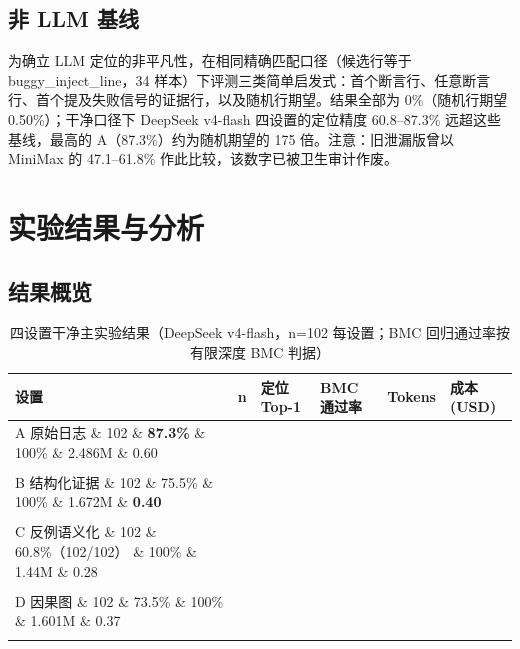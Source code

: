 \documentclass[journal]{IEEEtran}
\begin{document}
\subsection{非 LLM 基线}

为确立 LLM 定位的非平凡性，在相同精确匹配口径（候选行等于 buggy\_inject\_line，34 样本）下评测三类简单启发式：首个断言行、任意断言行、首个提及失败信号的证据行，以及随机行期望。结果全部为 0\%（随机行期望 0.50\%）；干净口径下 DeepSeek v4-flash 四设置的定位精度 60.8--87.3\% 远超这些基线，最高的 A（87.3\%）约为随机期望的 175 倍。注意：旧泄漏版曾以 MiniMax 的 47.1--61.8\% 作此比较，该数字已被卫生审计作废。

\section{实验结果与分析}

\subsection{结果概览}

\begin{table}[!t]
\centering
\caption{四设置干净主实验结果（DeepSeek v4-flash，n=102 每设置；BMC 回归通过率按有限深度 BMC 判据）}
\label{tab:main}
\scriptsize
\setlength{\tabcolsep}{3pt}
\renewcommand{\arraystretch}{1.12}
\begin{tabular}{p{}cp{}p{}p{}p{}}
\toprule
\textbf{设置} & \textbf{n} & \textbf{定位 Top-1} & \textbf{BMC 通过率} & \textbf{Tokens} & \textbf{成本(USD)} \\
\midrule
A 原始日志 \& 102 \& \textbf{87.3\%} \& 100\% \& 2.486M \& 0.60 \\\\
B 结构化证据 \& 102 \& 75.5\% \& 100\% \& 1.672M \& \textbf{0.40} \\\\
C 反例语义化 \& 102 \& 60.8\%（102/102） \& 100\% \& 1.44M \& 0.28 \\\\
D 因果图 \& 102 \& 73.5\% \& 100\% \& 1.601M \& 0.37 \\\\
\bottomrule
\end{tabular}
\end{table}
\end{document}
